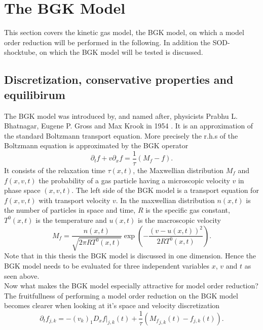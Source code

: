 

\chapter{The BGK Model}
\label{CH: BGK}




This section covers the kinetic gas model, the BGK model, on which a model order reduction will be performed in the following. In addition the SOD-shocktube, on which the BGK model will be tested is discussed.\\
\section{Discretization, conservative properties and equilibirum}
The BGK model was introduced by, and named after, physicists Prabhu L. Bhatnagar, Eugene P. Gross and Max Krook in 1954 \cite{BGK}. It is an approximation of the standard Boltzmann transport equation. More precisely the r.h.s of the Boltzmann equation is approximated by the BGK operator \cite{puppo2019kinetic}
\begin{equation}
\partial_t f + v \partial_x f = \frac{1}{\tau} (M_f - f) \text{.}
\label{Eq:BGK}
\end{equation}
It consists of the relaxation time \(\tau(x,t)\), the Maxwellian distribution \(M_f\) and \(f(x,v,t)\) the probability of a gas particle having a microscopic velocity \(v\) in phase space \((x,v,t)\). The left side of the BGK model is a transport equation for \(f(x,v,t)\) with transport velocity \(v\). In the maxwellian distribution \(n(x,t)\) is the number of particles in space and time, \(R\) is the specific gas constant, \(T^0(x,t)\) is the temperature and \(u(x,t)\) is the macroscopic velocity
\begin{equation}
M_f = \frac{n(x,t)}{\sqrt{2\pi R T^0(x,t)}}\exp(-\frac{(v - u(x,t))^2}{2 R T^0(x,t)}) \text{.}
\end{equation}
Note that in this thesis the BGK model is discussed in one dimension. Hence the BGK model needs to be evaluated for three independent variables \(x\), \(v\) and \(t\) as seen above.\\ 
Now what makes the BGK model especially attractive for model order reduction?
The fruitfullness of performing a model order reduction on the BGK model becomes clearer when looking at it's space and velocity discretization
\begin{equation}
	\partial_t f_{j,k} = -(v_k)_1D_x f|_{j,k}(t) + \frac{1}{\tau}({M_f}_{j,k}(t) - f_{j,k}(t)) \text{.}
	\label{Eq:Discrete BGK}
\end{equation}

